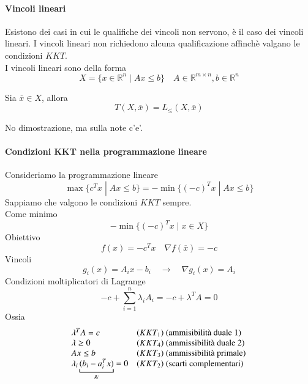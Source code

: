 \paragraph{Vincoli lineari}
Esistono dei casi in cui le qualifiche dei vincoli non servono, \`e
il caso dei vincoli lineari.
I vincoli lineari non richiedono alcuna qualificazione affinch\`e
valgano le condizioni $KKT$. \\
I vincoli lineari sono della forma
$$ X = \{ x \in \mathbb{R}^{n} \; | \; Ax \leq b \} \quad
A \in \mathbb{R}^{m \times n}, b \in \mathbb{R}^{n} $$

\begin{proposition}
Sia $\overline{x} \in X$, allora 
$$T(X, \overline{x}) =L_{\leq} (X, \overline{x})$$
\end{proposition}
\begin{notes}
No dimostrazione, ma sulla note c'e'.
\end{notes}
\paragraph{Condizioni KKT nella programmazione lineare}
Consideriamo la programmazione lineare
$$ \max \{c^{T}x \; | \;  Ax \leq b \}  = - \min\{(-c)^{T}x \; | \; Ax \leq b \}$$
Sappiamo che valgono le condizioni $KKT$ sempre. \\
Come minimo
$$  -\min \{(-c)^{T}x \; | \; x \in X \} $$
Obiettivo
$$ f(x)  = -c^{T}x \quad \nabla f(\overline{x}) = - c $$
Vincoli
$$ g_i(x) = A_i x - b_i  \quad \rightarrow \quad \nabla g_i(x) = A_i$$
Condizioni moltiplicatori di Lagrange 
$$ -c + \displaystyle \sum_{i=1}^{n} \lambda_i A_i
= -c + \lambda^{T} A = 0
$$
Ossia
$$
\begin{array}{ll}
   \lambda^{T}A = c  & (KKT_1) \text{ (ammisibilit\`a duale 1) } \\
  \lambda \geq 0  & (KKT_4) \text{ (ammissibilit\`a duale 2) } \\
   Ax \leq b & \text (KKT_3) \text{ (ammissibilit\`a primale)} \\
\lambda_i \underbracket{(b_i - a_i^{T}x)}_{g_i} = 0 &
 (KKT_2) \text{ (scarti complementari) } 
\end{array}
$$

